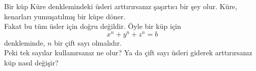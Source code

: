 \begin{surferPage}[Küp]{Bir küp}
Küre denklemindeki üsleri arttırırsanız şaşırtıcı bir şey olur. Küre, kenarları yumuşatılmış bir küpe döner.\\
\vspace{0.3cm}
Fakat bu tüm üsler için doğru değildir. Öyle bir küp için 
\[x^n+y^n+z^n=b\]
denkleminde, $n$ bir çift sayı olmalıdır.\\
\vspace{0.3cm}
Peki tek sayılar kullanırsanız ne olur? Ya da çift sayı üsleri giderek arttırırsanız küp nasıl değişir?
\end{surferPage}
